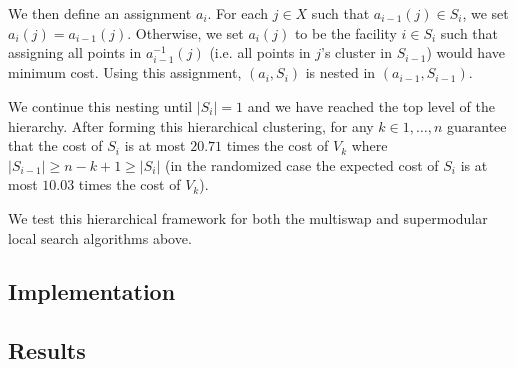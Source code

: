 \documentclass{article}
\begin{document}
We then define an assignment $a_i$. For each $j \in X$ such that $a_{i-1}(j) \in S_{i}$, we set $a_i(j) = a_{i-1}(j)$. Otherwise, we set $a_i(j)$ to be the facility $i \in S_i$ such that assigning all points in $a_{i-1}^{-1}(j)$ (i.e. all points in $j$'s cluster in $S_{i-1}$) would have minimum cost. Using this assignment, $(a_i, S_i)$ is nested in $(a_{i-1}, S_{i-1})$. 

We continue this nesting until $|S_i| = 1$ and we have reached the top level of the hierarchy. After forming this hierarchical clustering, for any $k \in 1, \ldots, n$ \cite{Lin} guarantee that the cost of $S_i$ is at most $20.71$ times the cost of $V_k$ where $|S_{i-1}| \geq n-k+1 \geq |S_{i}|$ (in the randomized case the expected cost of $S_i$ is at most $10.03$ times the cost of $V_k$).

We test this hierarchical framework for both the multiswap and supermodular local search algorithms above. 

\subsection{Implementation}

\subsection{Results}

\label{submission}




\end{document}
